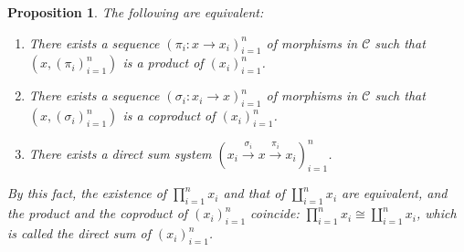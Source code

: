 \documentclass{surv-l}
\numberwithin{equation}{chapter}
\numberwithin{figure}{chapter}
\theoremstyle{plain}
\newtheorem{prp}[thm]{Proposition}
\theoremstyle{definition}
\theoremstyle{remark}
\begin{document}
\begin{prp}\label{prp:finprod-fincoprod-lincat}\label{prop:1.5.14}
The following are equivalent:
\begin{enumerate}
\item
There exists a sequence $(\pi_i \colon x \to x_i)_{i=1}^n$ of
morphisms in ${\mathcal{C}}$ such that
$(x, (\pi_i)_{i=1}^n)$ is a product of $(x_i)_{i=1}^n$.
\item
There exists a sequence $(\sigma_i \colon x_i \to x)_{i=1}^n$ of
morphisms in ${\mathcal{C}}$ such that
$(x, (\sigma_i)_{i=1}^n)$ is a coproduct of $(x_i)_{i=1}^n$.
\item
There exists a direct sum system $(x_i \xrightarrow{\sigma_i} x \xrightarrow{\pi_i} x_i)_{i=1}^n$.
\end{enumerate}
By this fact, the existence of $\prod_{i=1}^n x_i$ and that of $\coprod_{i=1}^n x_i$ are equivalent, and the product and the coproduct
of $(x_i)_{i=1}^n$ coincide:
$\prod_{i=1}^n x_i \cong \coprod_{i=1}^n x_i$,
which is called the \emph{direct sum} of $(x_i)_{i=1}^n$.
\end{prp}
\end{document}
